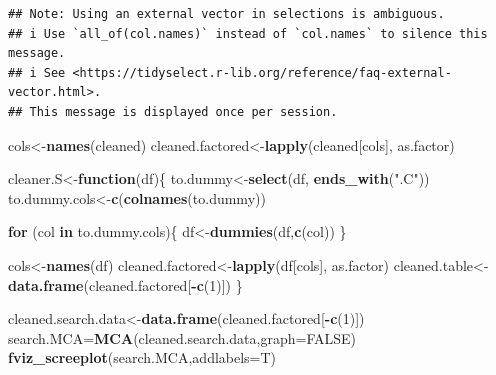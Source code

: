 \documentclass[
]{article}
\newenvironment{Shaded}{\begin{snugshade}}{\end{snugshade}}
\newcommand{\ControlFlowTok}[1]{\textcolor[rgb]{0.13,0.29,0.53}{\textbf{#1}}}
\newcommand{\DataTypeTok}[1]{\textcolor[rgb]{0.13,0.29,0.53}{#1}}
\newcommand{\DecValTok}[1]{\textcolor[rgb]{0.00,0.00,0.81}{#1}}
\newcommand{\KeywordTok}[1]{\textcolor[rgb]{0.13,0.29,0.53}{\textbf{#1}}}
\newcommand{\NormalTok}[1]{#1}
\newcommand{\OperatorTok}[1]{\textcolor[rgb]{0.81,0.36,0.00}{\textbf{#1}}}
\newcommand{\OtherTok}[1]{\textcolor[rgb]{0.56,0.35,0.01}{#1}}
\newcommand{\StringTok}[1]{\textcolor[rgb]{0.31,0.60,0.02}{#1}}
\begin{document}
\begin{verbatim}
## Note: Using an external vector in selections is ambiguous.
## i Use `all_of(col.names)` instead of `col.names` to silence this message.
## i See <https://tidyselect.r-lib.org/reference/faq-external-vector.html>.
## This message is displayed once per session.
\end{verbatim}

\begin{Shaded}
\begin{Highlighting}[]
\NormalTok{cols<-}\KeywordTok{names}\NormalTok{(cleaned)}
\NormalTok{cleaned.factored<-}\KeywordTok{lapply}\NormalTok{(cleaned[cols], as.factor)}
\end{Highlighting}
\end{Shaded}

\begin{Shaded}
\begin{Highlighting}[]
\NormalTok{cleaner.S<-}\ControlFlowTok{function}\NormalTok{(df)\{}
\NormalTok{  to.dummy<-}\KeywordTok{select}\NormalTok{(df, }\KeywordTok{ends_with}\NormalTok{(}\StringTok{".C"}\NormalTok{))}
\NormalTok{  to.dummy.cols<-}\KeywordTok{c}\NormalTok{(}\KeywordTok{colnames}\NormalTok{(to.dummy))}
  
  
  \ControlFlowTok{for}\NormalTok{ (col }\ControlFlowTok{in}\NormalTok{ to.dummy.cols)\{}
\NormalTok{    df<-}\KeywordTok{dummies}\NormalTok{(df,}\KeywordTok{c}\NormalTok{(col))}
\NormalTok{  \}}
  
 
\NormalTok{  cols<-}\KeywordTok{names}\NormalTok{(df)}
\NormalTok{  cleaned.factored<-}\KeywordTok{lapply}\NormalTok{(df[cols], as.factor)}
\NormalTok{  cleaned.table<-}\KeywordTok{data.frame}\NormalTok{(cleaned.factored[}\OperatorTok{-}\KeywordTok{c}\NormalTok{(}\DecValTok{1}\NormalTok{)])}
\NormalTok{\}}
\end{Highlighting}
\end{Shaded}

\begin{Shaded}
\begin{Highlighting}[]
\NormalTok{cleaned.search.data<-}\KeywordTok{data.frame}\NormalTok{(cleaned.factored[}\OperatorTok{-}\KeywordTok{c}\NormalTok{(}\DecValTok{1}\NormalTok{)])}
\NormalTok{search.MCA=}\KeywordTok{MCA}\NormalTok{(cleaned.search.data,}\DataTypeTok{graph=}\OtherTok{FALSE}\NormalTok{)}
\KeywordTok{fviz_screeplot}\NormalTok{(search.MCA,}\DataTypeTok{addlabels=}\NormalTok{T)}
\end{Highlighting}
\end{Shaded}
\end{document}
